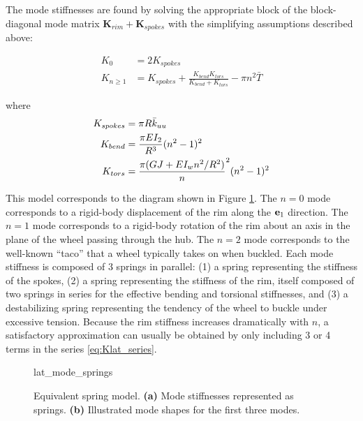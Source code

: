 \documentclass[\rootdir/thesis.tex]{subfiles}
\begin{document}
The mode stiffnesses are found by solving the appropriate block of the block-diagonal mode matrix $\mathbf{K}_{rim} + \mathbf{K}_{spokes}$ with the simplifying assumptions described above:

\begin{subequations}
\begin{align}
K_0 &= 2 K_{spokes}\\
K_{n\geq1} & = K_{spokes} + \frac{K_{bend}K_{tors}}{K_{bend} + K_{tors}} - \pi n^2 \bar{T}
\end{align}
\end{subequations}

where
\begin{align*}
K_{spokes} &= \pi R \bar{k}_{uu}\\
K_{bend} &= \frac{\pi EI_2}{R^3} (n^2-1)^2\\
K_{tors} &= \frac{\pi (GJ + EI_w n^2/R^2)}n^2(n^2-1)^2
\end{align*}

This model corresponds to the diagram shown in Figure \ref{fig:lat_mode_springs}. The $n=0$ mode corresponds to a rigid-body displacement of the rim along the $\mathbf{e}_1$ direction. The $n=1$ mode corresponds to a rigid-body rotation of the rim about an axis in the plane of the wheel passing through the hub. The $n=2$ mode corresponds to the well-known ``taco'' that a wheel typically takes on when buckled. Each mode stiffness is composed of 3 springs in parallel: (1) a spring representing the stiffness of the spokes, (2) a spring representing the stiffness of the rim, itself composed of two springs in series for the effective bending and torsional stiffnesses, and (3) a destabilizing spring representing the tendency of the wheel to buckle under excessive tension. Because the rim stiffness increases dramatically with $n$, a satisfactory approximation can usually be obtained by only including 3 or 4 terms in the series \eqref{eq:Klat_series}.

\begin{figure}[h]
\centering
{lat_mode_springs}
\caption{Equivalent spring model. \textbf{(a)} Mode stiffnesses represented as springs. \textbf{(b)} Illustrated mode shapes for the first three modes.}
\label{fig:lat_mode_springs}
\end{figure}
\end{document}
